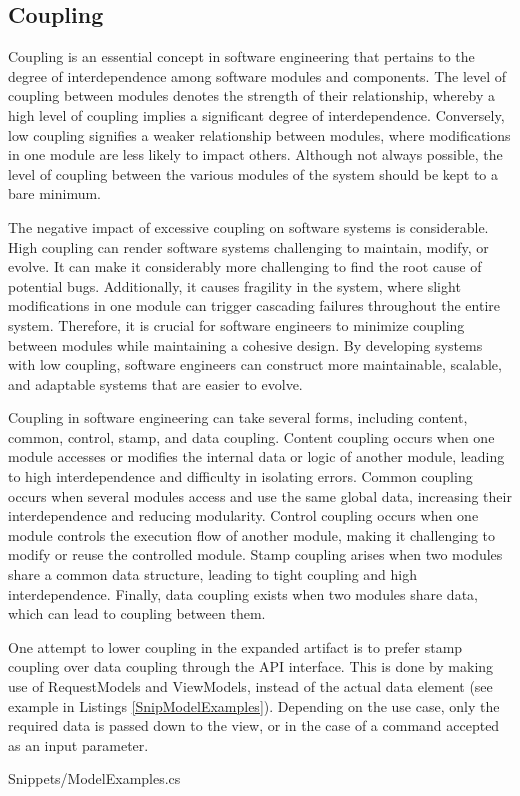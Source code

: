 \subsection{Coupling} \label{subsec_on_coupling}

Coupling is an essential concept in software engineering that pertains to the degree of
interdependence among software modules and components. The level of coupling between
modules denotes the strength of their relationship, whereby a high level of coupling
implies a significant degree of interdependence. Conversely, low coupling signifies a
weaker relationship between modules, where modifications in one module are less likely to
impact others. Although not always possible, the level of coupling between the various
modules of the system should be kept to a bare minimum.

The negative impact of excessive coupling on software systems is considerable. High
coupling can render software systems challenging to maintain, modify, or evolve. It can make
it considerably more challenging to find the root cause of potential bugs. Additionally, it
causes fragility in the system, where slight modifications in one module can trigger
cascading failures throughout the entire system. Therefore, it is crucial for software
engineers to minimize coupling between modules while maintaining a cohesive design. By
developing systems with low coupling, software engineers can construct more maintainable,
scalable, and adaptable systems that are easier to evolve.

Coupling in software engineering can take several forms, including content, common,
control, stamp, and data coupling. Content coupling occurs when one module accesses or
modifies the internal data or logic of another module, leading to high interdependence and
difficulty in isolating errors. Common coupling occurs when several modules access and use
the same global data, increasing their interdependence and reducing modularity. Control
coupling occurs when one module controls the execution flow of another module, making it
challenging to modify or reuse the controlled module. Stamp coupling arises when two modules
share a common data structure, leading to tight coupling and high interdependence.
Finally, data coupling exists when two modules share data, which can lead to coupling
between them.

One attempt to lower coupling in the expanded artifact is to prefer stamp coupling over
data coupling through the API interface. This is done by making use of RequestModels and
ViewModels, instead of the actual data element (see example in Listings \ref{SnipModelExamples}).
Depending on the use case, only the required data is passed down to the view, or in the
case of a command accepted as an input parameter.


    {Snippets/ModelExamples.cs}